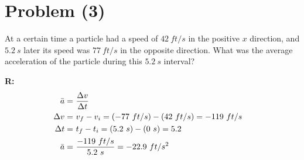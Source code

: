 \section{Problem (3)}
	At a certain time a particle had a speed of $42 \ ft/s$ in the positive $x$ direction, and $5.2 \ s$ later its speed was $77 \ ft/s$ in the opposite direction. What was the average acceleration of the particle during this $5.2 \ s$ interval?

	\textbf{R:} \newline
	\begin{align}
		\bar{a} = \ &\frac{\Delta v}{\Delta t}& \notag \\
		\Delta v = \ &v_{f} - v_{i} = (-77 \ ft/s) - (42 \ ft/s) = - 119 \ ft/s& \notag \\
		\Delta t = \ &t_{f} - t_{i} = (5.2 \ s) - (0 \ s) = 5.2& \notag \\
		\bar{a} = \ &\frac{- 119 \ ft/s}{5.2 \ s} = -22.9 \ ft/s^{2}&
	\end{align}
